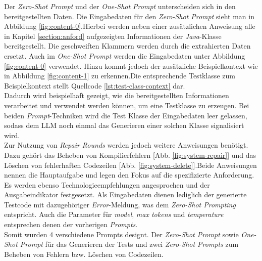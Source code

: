 Der \textit{Zero-Shot Prompt} und der \textit{One-Shot Prompt} unterscheiden sich in den bereitgestellten Daten. Die Eingabedaten für den \textit{Zero-Shot Prompt} sieht man in Abbildung \ref{fig:content-0}.Hierbei werden neben einer zusätzlichen Anweisung alle in Kapitel \ref{section:anford} aufgezeigten Informationen der \textit{Java}-Klasse bereitgestellt. Die geschweiften Klammern werden durch die extrahierten Daten ersetzt. Auch im \textit{One-Shot Prompt} werden die Eingabedaten unter Abbildung \ref{fig:content-0} verwendet. Hinzu kommt jedoch der zusätzliche Beispielkontext wie in Abbildung \ref{fig:content-1} zu erkennen.Die entsprechende Testklasse zum Beispielkontext stellt Quellcode \ref{lst:test-class-context} dar.\\
\vspace{-.3cm} Dadurch wird beispielhaft gezeigt, wie die bereitgestellten Informationen verarbeitet und verwendet werden können, um eine Testklasse zu erzeugen. Bei beiden \textit{Prompt}-Techniken wird die Test Klasse der Eingabedaten leer gelassen, sodass dem LLM noch einmal das Generieren einer solchen Klasse signalisiert wird.\\
Zur Nutzung von \textit{Repair Rounds} werden jedoch weitere Anweisungen benötigt. Dazu gehört das Beheben von Kompilierfehlern [Abb. \ref{fig:system-repair}] und das Löschen von fehlerhaften Codezeilen [Abb. \ref{fig:system-delete}].Beide Anweisungen nennen die Hauptaufgabe und legen den Fokus auf die spezifizierte Anforderung. Es werden ebenso Technologieempfehlungen angesprochen und der Ausgabeindikator festgesetzt. Als Eingabedaten dienen lediglich der generierte Testcode mit dazugehöriger \textit{Error}-Meldung, was dem \textit{Zero-Shot Prompting} entspricht. Auch die Parameter für \textit{model}, \textit{max tokens} und \textit{temperature} entsprechen denen der vorherigen \textit{Prompts}.\\
Somit wurden 4 verschiedene Prompts designt. Der \textit{Zero-Shot Prompt} sowie \textit{One-Shot Prompt} für das Generieren der Tests und zwei \textit{Zero-Shot Prompts} zum Beheben von Fehlern bzw. Löschen von Codezeilen. 

